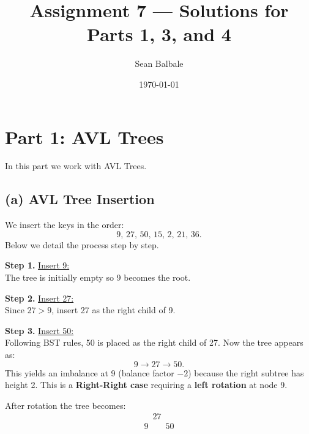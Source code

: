 \documentclass[11pt]{article}
\begin{document}
\title{Assignment 7 --- Solutions for Parts 1, 3, and 4}
\author{Sean Balbale}
\date{\today}
\maketitle

\section*{Part 1: AVL Trees}

In this part we work with AVL Trees.

\subsection*{(a) AVL Tree Insertion}

We insert the keys in the order:
\[
    9,\,27,\,50,\,15,\,2,\,21,\,36.
\]
Below we detail the process step by step.

\textbf{Step 1.} \underline{Insert 9:}\\[2mm]
The tree is initially empty so 9 becomes the root.


\begin{center}
\end{center}

\textbf{Step 2.} \underline{Insert 27:}\\[2mm]
Since $27>9$, insert 27 as the right child of 9.


\begin{center}
\end{center}

\textbf{Step 3.} \underline{Insert 50:}\\[2mm]
Following BST rules, 50 is placed as the right child of 27. Now the tree appears as:
\[
    9 \rightarrow 27 \rightarrow 50.
\]
This yields an imbalance at 9 (balance factor $-2$) because the right subtree has height 2. This is a \textbf{Right-Right case} requiring a \textbf{left rotation} at node 9.


After rotation the tree becomes:
\[
    \begin{array}{c}
        \quad 27 \\[4mm]
        9 \quad\quad50
    \end{array}
\]
\end{document}
